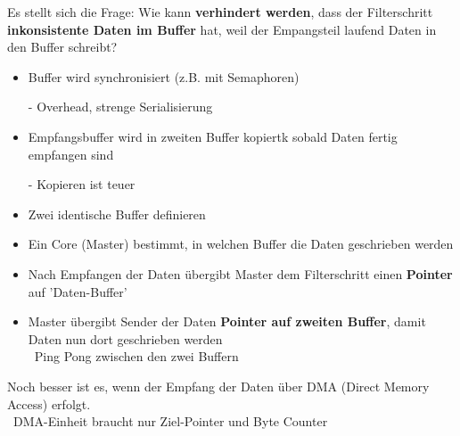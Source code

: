 \vspace{0.1cm}

Es stellt sich die Frage: Wie kann \textbf{verhindert werden}, dass der Filterschritt \textbf{inkonsistente Daten im Buffer} hat, weil der
Empangsteil laufend Daten in den Buffer schreibt?

\vspace{0.2cm}

\begin{minipage}[t]{0.45\columnwidth}

    \begin{itemize}
        \item Buffer wird synchronisiert (z.B. mit Semaphoren)
        \item[-] Overhead, strenge Serialisierung
    \end{itemize}
\end{minipage}
\hfill
\begin{minipage}[t]{0.52\columnwidth}

    \begin{itemize}
        \item Empfangsbuffer wird in zweiten Buffer kopiertk sobald Daten fertig empfangen sind
        \item[-] Kopieren ist teuer
    \end{itemize}
\end{minipage}



\begin{itemize}
    \item Zwei identische Buffer definieren
    \item Ein Core (Master) bestimmt, in welchen Buffer die Daten geschrieben werden
    \item Nach Empfangen der Daten übergibt Master dem Filterschritt einen \textbf{Pointer} auf 'Daten-Buffer'
    \item Master übergibt Sender der Daten \textbf{Pointer auf zweiten Buffer}, damit Daten nun dort geschrieben werden \\
        \textrightarrow\ Ping Pong zwischen den zwei Buffern
\end{itemize}

\vspace{0.1cm}

Noch besser ist es, wenn der Empfang der Daten über DMA (Direct Memory Access) erfolgt. \\
\textrightarrow\ DMA-Einheit braucht nur Ziel-Pointer und Byte Counter
